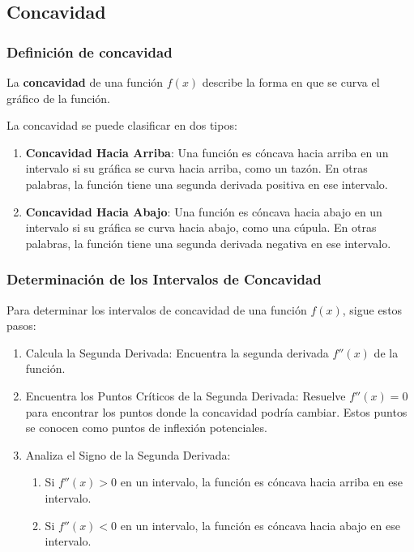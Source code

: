 \subsection{Concavidad} 

\subsubsection{Definición de concavidad}
\begin{definition}[Concavidad]
    La \textbf{concavidad} de una función \( f(x) \) describe la forma en que se curva el gráfico de la función. 
\end{definition}
La concavidad se puede clasificar en dos tipos:
\begin{enumerate}
    \item \textbf{Concavidad Hacia Arriba}: Una función es cóncava hacia arriba en un intervalo si su gráfica se curva hacia arriba, como un tazón. En otras palabras, la función tiene una segunda derivada positiva en ese intervalo.
    \item \textbf{Concavidad Hacia Abajo}: Una función es cóncava hacia abajo en un intervalo si su gráfica se curva hacia abajo, como una cúpula. En otras palabras, la función tiene una segunda derivada negativa en ese intervalo.
\end{enumerate}

\subsubsection{Determinación de los Intervalos de Concavidad}
Para determinar los intervalos de concavidad de una función \( f(x) \), sigue estos pasos:
\begin{enumerate}
    \item Calcula la Segunda Derivada:
    Encuentra la segunda derivada \( f''(x) \) de la función.
    \item Encuentra los Puntos Críticos de la Segunda Derivada:
    Resuelve \( f''(x) = 0 \) para encontrar los puntos donde la concavidad podría cambiar. Estos puntos se conocen como puntos de inflexión potenciales. 
    \item Analiza el Signo de la Segunda Derivada:
    \begin{enumerate}
        \item Si \( f''(x) > 0 \) en un intervalo, la función es cóncava hacia arriba en ese intervalo.
        \item  Si \( f''(x) < 0 \) en un intervalo, la función es cóncava hacia abajo en ese intervalo. 
    \end{enumerate}
\end{enumerate}
